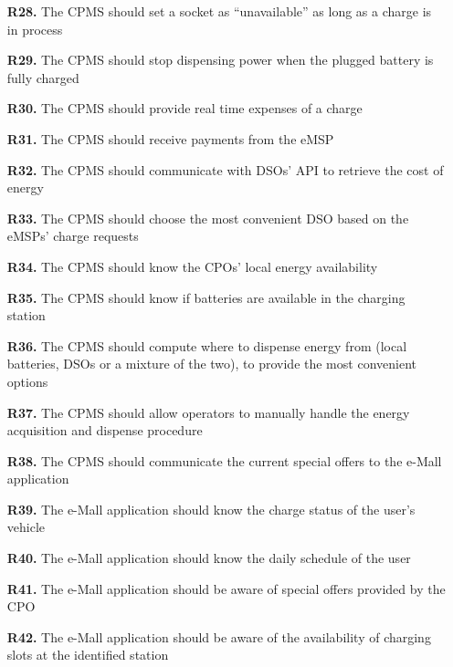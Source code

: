 \documentclass[12pt]{report}
\begin{document}
\begin{itemize}
\item[\textbf{R28.}]The CPMS should set a socket as “unavailable” as long as a charge is in process

\item[\textbf{R29.}]The CPMS should stop dispensing power when the plugged battery is fully charged

\item[\textbf{R30.}]The CPMS should provide real time expenses of a charge

\item[\textbf{R31.}]The CPMS should receive payments from the eMSP

\item[\textbf{R32.}]The CPMS should communicate with DSOs’ API to retrieve the cost of energy

\item[\textbf{R33.}]The CPMS should choose the most convenient DSO based on the eMSPs’ charge requests

\item[\textbf{R34.}]The CPMS should know the CPOs’ local energy availability 

\item[\textbf{R35.}]The CPMS should know if batteries are available in the charging station

\item[\textbf{R36.}]The CPMS should compute where to dispense energy from (local batteries, DSOs or a mixture of the two), to provide the most convenient options

\item[\textbf{R37.}]The CPMS should allow operators to manually handle the energy acquisition and dispense procedure

\item[\textbf{R38.}]The CPMS should communicate the current special offers to the e-Mall application

\item[\textbf{R39.}]The e-Mall application should know the charge status of the user’s vehicle

\item[\textbf{R40.}]The e-Mall application should know the daily schedule of the user

\item[\textbf{R41.}]The e-Mall application should be aware of special offers provided by the CPO

\item[\textbf{R42.}]The e-Mall application should be aware of the availability of charging slots at the identified station
\end{itemize}
\end{document}
